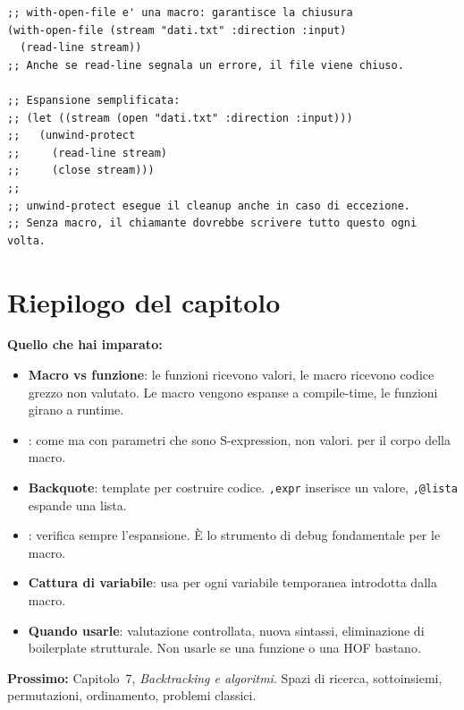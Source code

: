 \begin{esempio}
\begin{lstlisting}
;; with-open-file e' una macro: garantisce la chiusura
(with-open-file (stream "dati.txt" :direction :input)
  (read-line stream))
;; Anche se read-line segnala un errore, il file viene chiuso.

;; Espansione semplificata:
;; (let ((stream (open "dati.txt" :direction :input)))
;;   (unwind-protect
;;     (read-line stream)
;;     (close stream)))
;;
;; unwind-protect esegue il cleanup anche in caso di eccezione.
;; Senza macro, il chiamante dovrebbe scrivere tutto questo ogni volta.
\end{lstlisting}
\end{esempio}

\section*{Riepilogo del capitolo}

\begin{tcolorbox}[
  enhanced,
  colback=csBlue!5, colframe=csBlue!40,
  arc=4pt, boxrule=0.6pt,
  left=14pt, right=14pt, top=12pt, bottom=12pt,
  before skip=16pt, after skip=16pt
]
\textbf{Quello che hai imparato:}

\medskip
\begin{itemize}
  \item \textbf{Macro vs funzione}: le funzioni ricevono valori,
        le macro ricevono codice grezzo non valutato.
        Le macro vengono espanse a compile-time, le funzioni
        girano a runtime.
  \item \textbf{}: come  ma con parametri
        che sono S-expression, non valori.
         per il corpo della macro.
  \item \textbf{Backquote}: template per costruire codice.
        \texttt{,expr} inserisce un valore,
        \texttt{,@lista} espande una lista.
  \item \textbf{}: verifica sempre l'espansione.
        È lo strumento di debug fondamentale per le macro.
  \item \textbf{Cattura di variabile}: usa  per ogni
        variabile temporanea introdotta dalla macro.
  \item \textbf{Quando usarle}: valutazione controllata, nuova
        sintassi, eliminazione di boilerplate strutturale.
        Non usarle se una funzione o una HOF bastano.
\end{itemize}

\medskip
\textbf{Prossimo:} Capitolo~7, \emph{Backtracking e algoritmi}.
Spazi di ricerca, sottoinsiemi, permutazioni, ordinamento,
problemi classici.
\end{tcolorbox}

